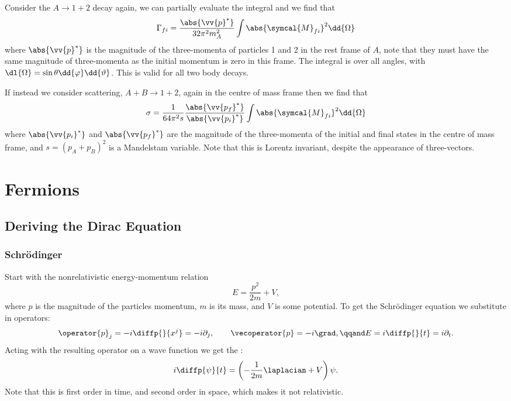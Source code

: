 \documentclass[fleqn]{NotesClass}
\newcommand{\amplitude}{\symcal{M}}
\begin{document}
    Consider the \(A \to 1 + 2\) decay again, we can partially evaluate the integral and we find that
    \begin{equation}
        \Gamma_{fi} = \frac{\abs{\vv{p}^*}}{32\pi^2 m_A^2} \int \abs{\amplitude_{fi}}^2 \dd{\Omega}
    \end{equation}
    where \(\abs{\vv{p}^*}\) is the magnitude of the three-momenta of particles 1 and 2 in the rest frame of \(A\), note that they must have the same magnitude of three-momenta as the initial momentum is zero in this frame.
    The integral is over all angles, with \(\dl{\Omega} = \sin\theta \dd{\varphi} \dd{\vartheta}\).
    This is valid for all two body decays.
    
    If instead we consider scattering, \(A + B \to 1 + 2\), again in the centre of mass frame then we find that
    \begin{equation}
        \sigma = \frac{1}{64\pi^2s} \frac{\abs{\vv{p_f}^*}}{\abs{\vv{p_i}^*}} \int \abs{\amplitude_{fi}}^2 \dd{\Omega}
    \end{equation}
    where \(\abs{\vv{p_i}^*}\) and \(\abs{\vv{p_f}^*}\) are the magnitude of the three-momenta of the initial and final states in the centre of mass frame, and \(s = (p_A + p_B)^2\) is a Mandelstam variable.
    Note that this is Lorentz invariant, despite the appearance of three-vectors.
    
    \part{Fermions}    
    \chapter{Deriving the Dirac Equation}
    \section{Schrödinger}
    Start with the nonrelativistic energy-momentum relation
    \begin{equation}
        E = \frac{p^2}{2m} + V,
    \end{equation}
    where \(p\) is the magnitude of the particles momentum, \(m\) is its mass, and \(V\) is some potential.
    To get the Schrödinger equation we substitute in operators:
    \begin{equation}
        \operator{p}_j = -i\diffp{}{x^j} = -i\partial_j, \qquad \vecoperator{p} = -i\grad, \qqand E = i\diffp{}{t} = i\partial_t.
    \end{equation}
    Acting with the resulting operator on a wave function we get the :
    \begin{equation}
        i\diffp{\psi}{t} = \left( -\frac{1}{2m} \laplacian + V \right)\psi.
    \end{equation}
    Note that this is first order in time, and second order in space, which makes it not relativistic.
    
\end{document}
